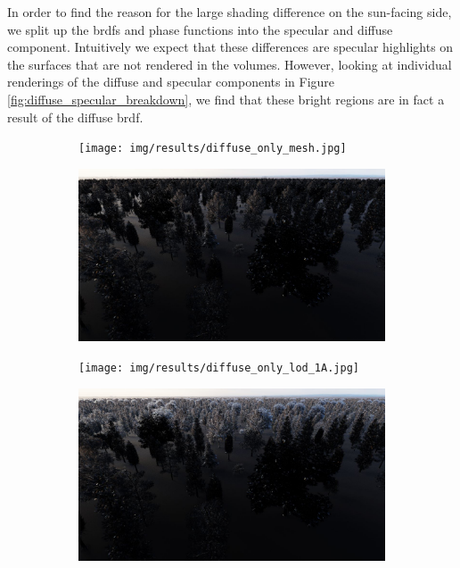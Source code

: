 In order to find the reason for the large shading difference on the sun-facing side, we split up the \acsp{brdf} and phase functions into the specular and diffuse component.
Intuitively we expect that these differences are specular highlights on the surfaces that are not rendered in the volumes.
However, looking at individual renderings of the diffuse and specular components in Figure \ref{fig:diffuse_specular_breakdown}, we find that these bright regions are in fact a result of the diffuse \ac{brdf}.
\begin{figure}[ht]
    \centering
    \begin{subfigure}[b]{0.49\linewidth}
        \centering
        \texttt{[image: img/results/diffuse\_only\_mesh.jpg]}
        \caption{}
    \end{subfigure}
    \begin{subfigure}[b]{0.49\linewidth}
        \centering
        \includegraphics[width=1\linewidth]{img/results/specular_only_mesh.jpg}
        \caption{}
    \end{subfigure}
    \begin{subfigure}[b]{0.49\linewidth}
        \centering
        \texttt{[image: img/results/diffuse\_only\_lod\_1A.jpg]}
        \caption{}
    \end{subfigure}
    \begin{subfigure}[b]{0.49\linewidth}
        \centering
        \includegraphics[width=1\linewidth]{img/results/specular_only_lod_1A.jpg}

\end{subfigure}
\end{figure}
